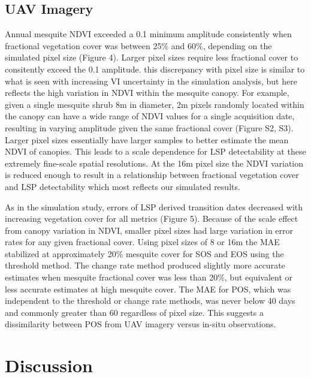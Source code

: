 \documentclass{article}
\begin{document}
\subsection{UAV Imagery}

Annual mesquite NDVI exceeded a 0.1 minimum amplitude consistently when fractional vegetation cover was between 25\% and 60\%, depending on the simulated pixel size (Figure 4). Larger pixel sizes require less fractional cover to consitently exceed the 0.1 amplitude. this discrepancy with pixel size is similar to what is seen with increasing VI uncertainty in the simulation analysis, but here reflects the high variation in NDVI within the mesquite canopy. For example, given a single mesquite shrub 8m in diameter, 2m pixels randomly located within the canopy can have a wide range of NDVI values for a single acquisition date, resulting in varying amplitude given the same fractional cover (Figure S2, S3). Larger pixel sizes essentially have larger samples to better estimate the mean NDVI of canopies. This leads to a scale dependence for LSP detectability at these extremely fine-scale spatial resolutions. At the 16m pixel size the NDVI variation is reduced enough to result in a relationship between fractional vegetation cover and LSP detectability which most reflects our simulated results.

As in the simulation study, errors of LSP derived transition dates decreased with increasing vegetation cover for all metrics (Figure 5). Because of the scale effect from canopy variation in NDVI, smaller pixel sizes had large variation in error rates for any given fractional cover. Using pixel sizes of 8 or 16m the MAE stabilized at approximately 20\% mesquite cover for SOS and EOS using the threshold method. The change rate method produced slightly more accurate estimates when mesquite fractional cover was less than 20\%, but equivalent or less accurate estimates at high mesquite cover. The MAE for POS, which was independent to the threshold or change rate methods, was never below 40 days and commonly greater than 60 regardless of pixel size. This suggests a dissimilarity between POS from UAV imagery versus in-situ observations.


\section{Discussion}
\end{document}
